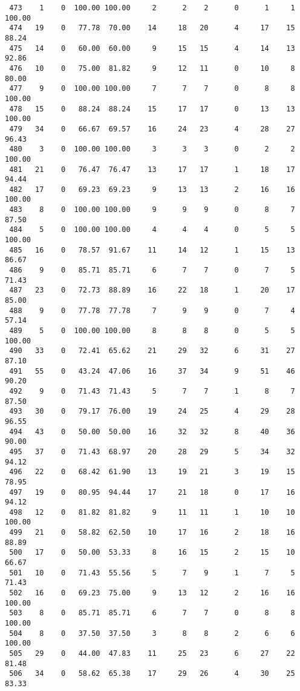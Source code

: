 \begin{verbatim}
 473    1    0  100.00 100.00     2      2    2      0      1     1   100.00
 474   19    0   77.78  70.00    14     18   20      4     17    15    88.24
 475   14    0   60.00  60.00     9     15   15      4     14    13    92.86
 476   10    0   75.00  81.82     9     12   11      0     10     8    80.00
 477    9    0  100.00 100.00     7      7    7      0      8     8   100.00
 478   15    0   88.24  88.24    15     17   17      0     13    13   100.00
 479   34    0   66.67  69.57    16     24   23      4     28    27    96.43
 480    3    0  100.00 100.00     3      3    3      0      2     2   100.00
 481   21    0   76.47  76.47    13     17   17      1     18    17    94.44
 482   17    0   69.23  69.23     9     13   13      2     16    16   100.00
 483    8    0  100.00 100.00     9      9    9      0      8     7    87.50
 484    5    0  100.00 100.00     4      4    4      0      5     5   100.00
 485   16    0   78.57  91.67    11     14   12      1     15    13    86.67
 486    9    0   85.71  85.71     6      7    7      0      7     5    71.43
 487   23    0   72.73  88.89    16     22   18      1     20    17    85.00
 488    9    0   77.78  77.78     7      9    9      0      7     4    57.14
 489    5    0  100.00 100.00     8      8    8      0      5     5   100.00
 490   33    0   72.41  65.62    21     29   32      6     31    27    87.10
 491   55    0   43.24  47.06    16     37   34      9     51    46    90.20
 492    9    0   71.43  71.43     5      7    7      1      8     7    87.50
 493   30    0   79.17  76.00    19     24   25      4     29    28    96.55
 494   43    0   50.00  50.00    16     32   32      8     40    36    90.00
 495   37    0   71.43  68.97    20     28   29      5     34    32    94.12
 496   22    0   68.42  61.90    13     19   21      3     19    15    78.95
 497   19    0   80.95  94.44    17     21   18      0     17    16    94.12
 498   12    0   81.82  81.82     9     11   11      1     10    10   100.00
 499   21    0   58.82  62.50    10     17   16      2     18    16    88.89
 500   17    0   50.00  53.33     8     16   15      2     15    10    66.67
 501   10    0   71.43  55.56     5      7    9      1      7     5    71.43
 502   16    0   69.23  75.00     9     13   12      2     16    16   100.00
 503    8    0   85.71  85.71     6      7    7      0      8     8   100.00
 504    8    0   37.50  37.50     3      8    8      2      6     6   100.00
 505   29    0   44.00  47.83    11     25   23      6     27    22    81.48
 506   34    0   58.62  65.38    17     29   26      4     30    25    83.33

\end{verbatim}

